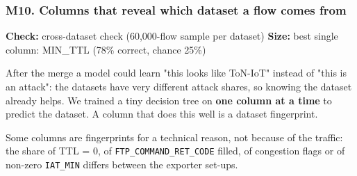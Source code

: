 \documentclass[10pt,a4paper]{article}
\newcommand{\meta}[2]{{\small\color{muted}\textbf{Check:} #1 \quad\textbar\quad \textbf{Size:} #2}}
\newenvironment{problem}{\par\noindent\begin{minipage}{\linewidth}\setlength{\parskip}{4pt}}{\end{minipage}\par\bigskip}
\begin{document}
\begin{problem}
\subsubsection*{M10. Columns that reveal which dataset a flow comes from}
\meta{cross-dataset check (60,000-flow sample per dataset)}{best single column: MIN\_TTL (78\% correct, chance 25\%)}

After the merge a model could learn "this looks like ToN-IoT" instead of "this is an attack": the datasets have very different attack shares, so knowing the dataset already helps. We trained a tiny decision tree on \textbf{one column at a time} to predict the dataset. A column that does this well is a dataset fingerprint.

Some columns are fingerprints for a technical reason, not because of the traffic: the share of TTL = 0, of \texttt{FTP\_\allowbreak{}COMMAND\_\allowbreak{}RET\_\allowbreak{}CODE} filled, of congestion flags or of non-zero \texttt{IAT\_\allowbreak{}MIN} differs between the exporter set-ups.


\end{problem}
\end{document}
